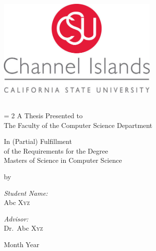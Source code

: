 \begin{titlepage}
\begin{center}
\begin{singlespacing}
\includegraphics[width=0.60\textwidth]{media/correctlogo.jpg}~\\


\HRule \\[0.5cm]
{\Large \bfseries \thesistitle \par}

\vspace{0.5 cm}

\baselineskip = 2\baselineskip
A Thesis Presented to \\
The Faculty of the Computer Science Department

\vspace{0.5 cm}

In (Partial) Fulfillment\\
of the Requirements for the Degree\\
Masters of Science in Computer Science\\

\vspace{0.5 cm }


by \\

\begin{minipage}{0.4\textwidth}
\begin{flushleft} \small
\emph{Student Name:}\\
Abc \textsc{Xyz}
\end{flushleft}
\end{minipage}
\begin{minipage}{0.4\textwidth}
\begin{flushright} \small
\emph{Advisor:} \\
Dr.~Abc \textsc{Xyz}
\end{flushright}
\end{minipage}

Month Year\\
\HRule \\[1.0cm]
\end{singlespacing}
\end{center}
\end{titlepage}
